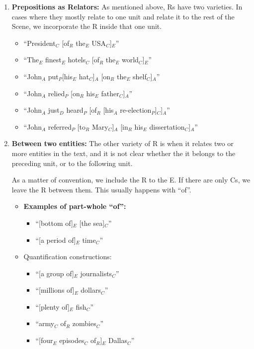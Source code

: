 \documentclass[11pt]{article}
\begin{document}
\begin{enumerate}
\item
{\bf Prepositions as Relators:} As mentioned above, Rs have two varieties. In cases where they mostly relate to one unit and relate it to the rest of the Scene, we incorporate the R inside that one unit.
\begin{itemize}
\item
``President$_C$ [of$_R$ the$_E$ USA$_C$]$_E$''
\item
``The$_E$ finest$_E$ hotels$_C$ [of$_R$ the$_E$ world$_C$]$_E$''
\item
``John$_A$ put$_P $[his$_E$ hat$_C$]$_A$ [on$_R$ the$_E$ shelf$_C$]$_A$''
\item
``John$_A$ relied$_P$ [on$_R$ his$_E$ father$_C$]$_A$''
\item
``John$_A$ just$_D$ heard$_P$ [of$_R$ [his$_A$ re-election$_P$]$_C$]$_A$''
\item
``John$_A$ referred$_P$ [to$_R$ Mary$_C$]$_A$ [in$_R$ his$_E$ dissertation$_C$]$_A$''
\end{itemize}

\item
{\bf Between two entities:} The other variety of R is when it relates two or more entities in the text, and it is not clear whether the it belongs to the preceding unit, or to the following unit.

As a matter of convention, we include the R to the E. If there are only Cs, we leave the R between them. This usually happens with ``of''.

\begin{itemize}
\item
{\bf Examples of part-whole ``of'':}
\begin{itemize}
\item
``[bottom of]$_E$ [the sea]$_C$''
\item
``[a period of]$_E$ time$_C$''
\end{itemize}

\item
Quantification constructions:
\begin{itemize}
\item ``[a group of]$_E$ journalists$_C$''
\item ``[millions of]$_E$ dollars$_C$''
\item ``[plenty of]$_E$ fish$_C$''
\item  ``army$_C$ of$_R$ zombies$_C$''
\item ``[four$_E$ episodes$_C$ of$_R$]$_E$ Dallas$_C$''
\end{itemize}


\end{itemize}
\end{enumerate}
\end{document}
